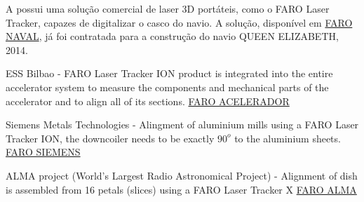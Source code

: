 

A  possui uma solução comercial de laser 3D portáteis,
como o FARO Laser Tracker, capazes de digitalizar o casco do navio. A solução,
disponível em
\href{http://www.faro.com/measurement-solutions/industries/shipbuilding/2015/02/18/scanning-at-depth-three-dimensional-measurement-of-an-ocean-giant}{FARO
NAVAL}, já foi contratada para a construção do navio QUEEN ELIZABETH, 2014.

ESS Bilbao -  FARO Laser Tracker ION product is integrated into the entire accelerator 
system to measure the components and mechanical parts of the accelerator and to align 
all of its sections.
\href{http://www.faro.com/measurement-solutions/applications/alignment/2013/02/15/faro-laser-tracker-integrated-into-the-ess-bilbao-particle-accelerator}{FARO
 ACELERADOR}

Siemens Metals Technologies - Alingment of aluminium mills using a FARO Laser Tracker ION, 
the downcoiler needs to be exactly $90^o$ to the aluminium sheets.
\href{http://www.faro.com/measurement-solutions/applications/alignment/2012/06/19/perfect-alignment-for-steel-and-aluminium-mills-at-siemens-with-faro-devices}{FARO
SIEMENS}

ALMA project (World's Largest Radio Astronomical Project) - Alignment of dish is
assembled from 16 petals (slices) using a FARO Laser Tracker X
\href{http://www.faro.com/measurement-solutions/applications/alignment/2012/03/02/world-s-largest-radio-astronomical-project-in-the-atacama-desert-in-chile}{FARO
ALMA}
